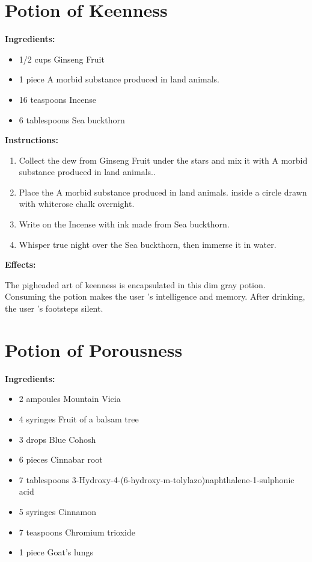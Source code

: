 \documentclass{article}
\begin{document}
\newpage
\section*{Potion of Keenness}

\textbf{Ingredients:}

\begin{itemize}
  \item 1/2 cups Ginseng Fruit
  \item 1 piece A morbid substance produced in land animals.
  \item 16 teaspoons Incense
  \item 6 tablespoons Sea buckthorn
\end{itemize}

\textbf{Instructions:}

\begin{enumerate}
  \item Collect the dew from Ginseng Fruit under the stars and mix it with A morbid substance produced in land animals..
  \item Place the A morbid substance produced in land animals. inside a circle drawn with whiterose chalk overnight.
  \item Write on the Incense with ink made from Sea buckthorn.
  \item Whisper true night over the Sea buckthorn, then immerse it in water.
\end{enumerate}

\textbf{Effects:}

The pigheaded art of keenness is encapsulated in this dim gray potion. Consuming the potion makes the user 's intelligence and memory. After drinking, the user 's footsteps silent.

\newpage
\section*{Potion of Porousness}

\textbf{Ingredients:}

\begin{itemize}
  \item 2 ampoules Mountain Vicia
  \item 4 syringes Fruit of a balsam tree
  \item 3 drops Blue Cohosh
  \item 6 pieces Cinnabar root
  \item 7 tablespoons 3-Hydroxy-4-(6-hydroxy-m-tolylazo)naphthalene-1-sulphonic acid
  \item 5 syringes Cinnamon
  \item 7 teaspoons Chromium trioxide
  \item 1 piece Goat's lungs
\end{itemize}
\end{document}
